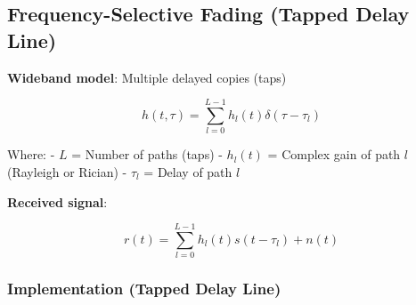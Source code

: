 \subsection{Frequency-Selective Fading (Tapped Delay
Line)}\label{frequency-selective-fading-tapped-delay-line}

\textbf{Wideband model}: Multiple delayed copies (taps)

\[
h(t, \tau) = \sum_{l=0}^{L-1} h_l(t) \delta(\tau - \tau_l)
\]

Where: - \(L\) = Number of paths (taps) - \(h_l(t)\) = Complex gain of
path \(l\) (Rayleigh or Rician) - \(\tau_l\) = Delay of path \(l\)

\textbf{Received signal}:

\[
r(t) = \sum_{l=0}^{L-1} h_l(t) s(t - \tau_l) + n(t)
\]


\subsubsection{Implementation (Tapped Delay
Line)}\label{implementation-tapped-delay-line}

